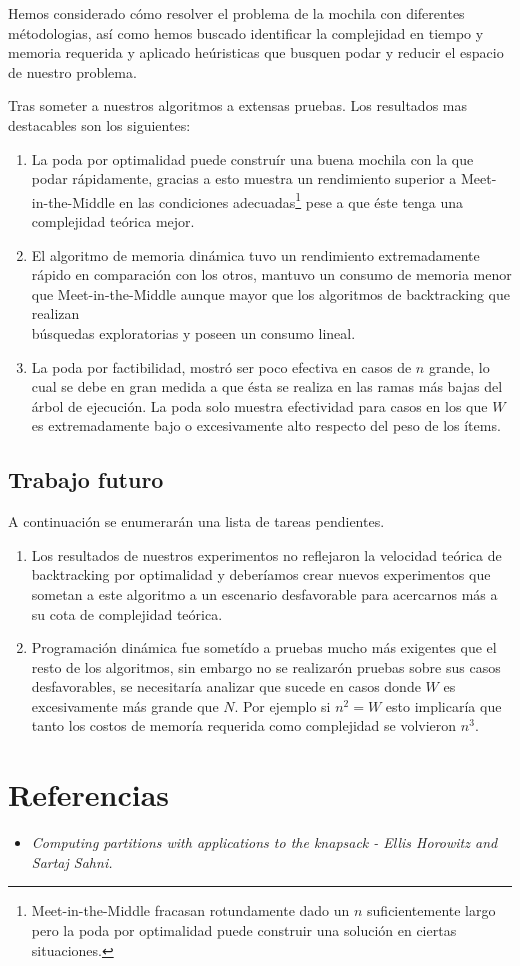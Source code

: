 \documentclass[fleqn, 11pt]{article}
\begin{document}
Hemos considerado cómo resolver el problema de la mochila con diferentes
métodologias, así como hemos buscado identificar la complejidad en tiempo y
memoria requerida y aplicado heúristicas que busquen podar y reducir el espacio
de nuestro problema.

Tras someter a nuestros algoritmos a extensas pruebas. Los resultados mas
destacables son los siguientes:

\begin{enumerate}
	\item La poda por optimalidad puede construír una buena mochila con la
	que podar rápidamente, gracias a esto muestra un rendimiento superior a
	Meet-in-the-Middle en las condiciones
	adecuadas\footnote{Meet-in-the-Middle fracasan rotundamente dado un $n$
	suficientemente largo pero la poda por optimalidad puede construir una
	solución en ciertas situaciones.} pese a que éste tenga una complejidad
	teórica mejor.

	\item El algoritmo de memoria dinámica tuvo un rendimiento
	extremadamente rápido en comparación con los otros, mantuvo un consumo
	de memoria menor que Meet-in-the-Middle aunque mayor que los algoritmos
	de backtracking que realizan\\búsquedas exploratorias y poseen un
	consumo lineal.
	
	\item La poda por factibilidad, mostró ser poco efectiva en casos de
	$n$ grande, lo cual se debe en gran medida a que ésta se realiza en las
	ramas más bajas del árbol de ejecución. La poda solo muestra
	efectividad para casos en los que $W$ es extremadamente bajo o
	excesivamente alto respecto del peso de los ítems.
\end{enumerate}

\subsection{Trabajo futuro}

A continuación se enumerarán una lista de tareas pendientes.
\begin{enumerate}
\item Los resultados de nuestros experimentos no reflejaron la velocidad teórica de backtracking por optimalidad y deberíamos crear nuevos experimentos que sometan a este algoritmo a un escenario desfavorable para acercarnos más a su cota de complejidad teórica.

\item Programación dinámica fue sometído a pruebas mucho más exigentes que el resto de los algoritmos, sin embargo no se realizarón pruebas sobre sus casos desfavorables, se necesitaría analizar que sucede en casos donde $W$ es excesivamente más grande que $N$. Por ejemplo si $n^2 = W$ esto implicaría que tanto los costos de memoría requerida como complejidad se volvieron $n^3$.



\end{enumerate}



\section{Referencias}
\begin{itemize}
	\item[] \textit{Computing partitions with applications to the knapsack
	- Ellis Horowitz and Sartaj Sahni.}
\end{itemize}
\end{document}
